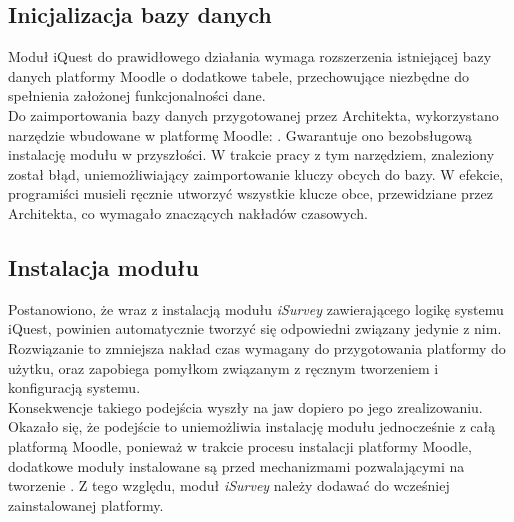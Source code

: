 \subsection{Inicjalizacja bazy danych}
\label{Chapter623}

Moduł iQuest do prawidłowego działania wymaga rozszerzenia istniejącej bazy danych platformy Moodle o dodatkowe tabele, przechowujące niezbędne do spełnienia założonej funkcjonalności dane. \\

Do zaimportowania bazy danych przygotowanej przez Architekta, wykorzystano narzędzie wbudowane w platformę Moodle: . Gwarantuje ono bezobsługową instalację modułu w przyszłości. W trakcie pracy z tym narzędziem, znaleziony został błąd, uniemożliwiający zaimportowanie kluczy obcych do bazy. W efekcie, programiści musieli ręcznie utworzyć wszystkie klucze obce, przewidziane przez Architekta, co wymagało znaczących nakładów czasowych.

\subsection{Instalacja modułu}
\label{Chapter624}
Postanowiono, że wraz z instalacją modułu \textit{iSurvey} zawierającego logikę systemu iQuest, powinien automatycznie tworzyć się odpowiedni  związany jedynie z nim. Rozwiązanie to zmniejsza nakład czas wymagany do przygotowania platformy do użytku, oraz zapobiega pomyłkom związanym z ręcznym tworzeniem i konfiguracją systemu. \\

Konsekwencje takiego podejścia wyszły na jaw dopiero po jego zrealizowaniu. Okazało się, że podejście to uniemożliwia instalację modułu jednocześnie z całą platformą Moodle, ponieważ w trakcie procesu instalacji platformy Moodle, dodatkowe moduły instalowane są przed mechanizmami pozwalającymi na tworzenie . Z tego względu, moduł \textit{iSurvey} należy dodawać do wcześniej zainstalowanej platformy.